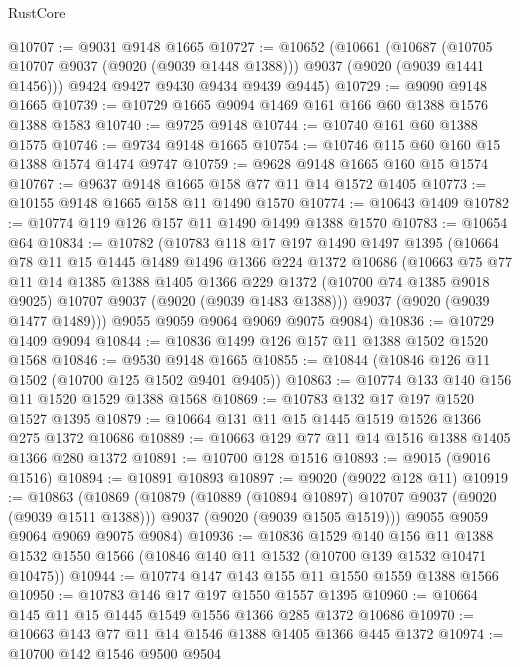 \begin{lexlean}{RustCore}
\begin{coremodule}
@10707 := @9031 @9148 @1665
@10727 := @10652
    (@10661
      (@10687 (@10705 @10707 @9037 (@9020 (@9039 @1448 @1388))) @9037 (@9020 (@9039 @1441 @1456)))
      @9424
      @9427
      @9430
      @9434
      @9439
      @9445)
@10729 := @9090 @9148 @1665
@10739 := @10729 @1665 @9094 @1469 @161 @166 @60 @1388 @1576 @1388 @1583
@10740 := @9725 @9148
@10744 := @10740 @161 @60 @1388 @1575
@10746 := @9734 @9148 @1665
@10754 := @10746 @115 @60 @160 @15 @1388 @1574 @1474 @9747
@10759 := @9628 @9148 @1665 @160 @15 @1574
@10767 := @9637 @9148 @1665 @158 @77 @11 @14 @1572 @1405
@10773 := @10155 @9148 @1665 @158 @11 @1490 @1570
@10774 := @10643 @1409
@10782 := @10774 @119 @126 @157 @11 @1490 @1499 @1388 @1570
@10783 := @10654 @64
@10834 := @10782
    (@10783
      @118
      @17
      @197
      @1490
      @1497
      @1395
      (@10664
        @78
        @11
        @15
        @1445
        @1489
        @1496
        @1366
        @224
        @1372
        @10686
        (@10663
          @75
          @77
          @11
          @14
          @1385
          @1388
          @1405
          @1366
          @229
          @1372
          (@10700 @74 @1385 @9018 @9025)
          @10707
          @9037
          (@9020 (@9039 @1483 @1388)))
        @9037
        (@9020 (@9039 @1477 @1489)))
      @9055
      @9059
      @9064
      @9069
      @9075
      @9084)
@10836 := @10729 @1409 @9094
@10844 := @10836 @1499 @126 @157 @11 @1388 @1502 @1520 @1568
@10846 := @9530 @9148 @1665
@10855 := @10844 (@10846 @126 @11 @1502 (@10700 @125 @1502 @9401 @9405))
@10863 := @10774 @133 @140 @156 @11 @1520 @1529 @1388 @1568
@10869 := @10783 @132 @17 @197 @1520 @1527 @1395
@10879 := @10664 @131 @11 @15 @1445 @1519 @1526 @1366 @275 @1372 @10686
@10889 := @10663 @129 @77 @11 @14 @1516 @1388 @1405 @1366 @280 @1372
@10891 := @10700 @128 @1516
@10893 := @9015 (@9016 @1516)
@10894 := @10891 @10893
@10897 := @9020 (@9022 @128 @11)
@10919 := @10863
    (@10869
      (@10879
        (@10889 (@10894 @10897) @10707 @9037 (@9020 (@9039 @1511 @1388)))
        @9037
        (@9020 (@9039 @1505 @1519)))
      @9055
      @9059
      @9064
      @9069
      @9075
      @9084)
@10936 := @10836
    @1529
    @140
    @156
    @11
    @1388
    @1532
    @1550
    @1566
    (@10846 @140 @11 @1532 (@10700 @139 @1532 @10471 @10475))
@10944 := @10774 @147 @143 @155 @11 @1550 @1559 @1388 @1566
@10950 := @10783 @146 @17 @197 @1550 @1557 @1395
@10960 := @10664 @145 @11 @15 @1445 @1549 @1556 @1366 @285 @1372 @10686
@10970 := @10663 @143 @77 @11 @14 @1546 @1388 @1405 @1366 @445 @1372
@10974 := @10700 @142 @1546 @9500 @9504

\end{coremodule}
\end{lexlean}
